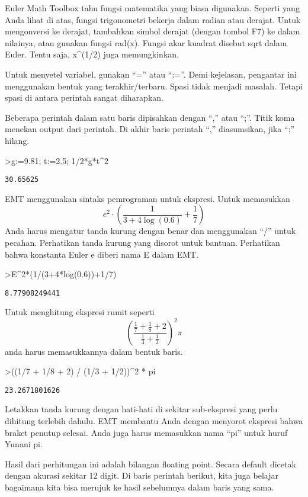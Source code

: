 \documentclass[
]{book}
\begin{document}
Euler Math Toolbox tahu fungsi matematika yang biasa digunakan. Seperti yang Anda lihat di atas, fungsi trigonometri bekerja dalam radian atau derajat. Untuk mengonversi ke derajat, tambahkan simbol derajat (dengan tombol F7) ke dalam nilainya, atau gunakan fungsi rad(x). Fungsi akar kuadrat disebut sqrt dalam Euler. Tentu saja, x\^{}(1/2) juga memungkinkan.

Untuk menyetel variabel, gunakan ``='' atau ``:=''. Demi kejelasan, pengantar ini menggunakan bentuk yang terakhir/terbaru. Spasi tidak menjadi masalah. Tetapi spasi di antara perintah sangat diharapkan.

Beberapa perintah dalam satu baris dipisahkan dengan ``,'' atau ``;''. Titik koma menekan output dari perintah. Di akhir baris perintah ``,'' diasumsikan, jika ``;'' hilang.

\textgreater g:=9.81; t:=2.5; 1/2*g*t\^{}2

\begin{verbatim}
30.65625
\end{verbatim}

EMT menggunakan sintaks pemrograman untuk ekspresi. Untuk memasukkan \[e^2 \cdot \left( \frac{1}{3+4 \log(0.6)}+\frac{1}{7} \right)\]Anda harus mengatur tanda kurung dengan benar dan menggunakan ``/'' untuk pecahan. Perhatikan tanda kurung yang disorot untuk bantuan. Perhatikan bahwa konstanta Euler e diberi nama E dalam EMT.

\textgreater E\^{}2*(1/(3+4*log(0.6))+1/7)

\begin{verbatim}
8.77908249441
\end{verbatim}

Untuk menghitung ekspresi rumit seperti \[\left(\frac{\frac17 + \frac18 + 2}{\frac13 + \frac12}\right)^2 \pi\]anda harus memasukkannya dalam bentuk baris.

\textgreater((1/7 + 1/8 + 2) / (1/3 + 1/2))\^{}2 * pi

\begin{verbatim}
23.2671801626
\end{verbatim}

Letakkan tanda kurung dengan hati-hati di sekitar sub-ekspresi yang perlu dihitung terlebih dahulu. EMT membantu Anda dengan menyorot ekspresi bahwa braket penutup selesai. Anda juga harus memasukkan nama ``pi'' untuk huruf Yunani pi.

Hasil dari perhitungan ini adalah bilangan floating point. Secara default dicetak dengan akurasi sekitar 12 digit. Di baris perintah berikut, kita juga belajar bagaimana kita bisa merujuk ke hasil sebelumnya dalam baris yang sama.
\end{document}

